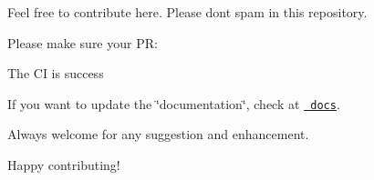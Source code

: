 Feel free to contribute here. Please don\textquotesingle{}t spam in this repository.

Please make sure your PR\+:


\begin{DoxyItemize}
\item The CI is success
\item If you want to update the \char`\"{}documentation\char`\"{}, check at \href{docs/}{\texttt{ docs}}.
\item Always welcome for any suggestion and enhancement.
\end{DoxyItemize}

Happy contributing! 